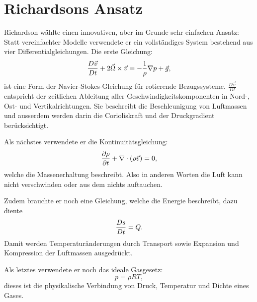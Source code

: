 %
%
%
%
\section{Richardsons Ansatz \label{geostrophisch:section:richardsonAnsatz}}

Richardson wählte einen innovativen, aber im Grunde sehr einfachen Ansatz:  
Statt vereinfachter Modelle verwendete er ein vollständiges System bestehend aus vier Differentialgleichungen.
Die erste Gleichung:
\begin{equation}
	\frac{D\vec{v}}{Dt} + 2\vec{\Omega} \times \vec{v} = -\frac{1}{\rho}\nabla p + \vec{g} \\,
	\label{eq:navstok}
\end{equation}
ist eine Form der Navier-Stokes-Gleichung für rotierende Bezugssysteme.
$\frac{D\vec{v}}{Dt}$ entspricht der zeitlichen Ableitung aller Geschwindigkeitskomponenten in Nord-, Ost- und Vertikalrichtungen. 
Sie beschreibt die Beschleunigung von Luftmassen und ausserdem werden darin die Corioliskraft und der Druckgradient berücksichtigt.

Als nächstes verwendete er die Kontinuitätsgleichung:
\begin{equation}
	\frac{\partial \rho}{\partial t} + \nabla \cdot (\rho \vec{v}) = 0 \\,
	\label{eq:kont}
\end{equation}
welche die Massenerhaltung beschreibt.
Also in anderen Worten die Luft kann nicht verschwinden oder aus dem nichts auftauchen. 

Zudem brauchte er noch eine Gleichung, welche die Energie beschreibt, dazu diente 
\begin{equation}
	\frac{Ds}{Dt} = Q \\.
	\label{eq:enrgy}
\end{equation}
Damit werden Temperaturänderungen durch Transport sowie Expansion und Kompression der Luftmassen ausgedrückt.

Als letztes verwendete er noch das ideale Gasgesetz:
\begin{equation}
	p = \rho R T,
	\label{eq:gasgesetz}
\end{equation}
dieses ist die physikalische Verbindung von Druck, Temperatur und Dichte eines Gases.  

